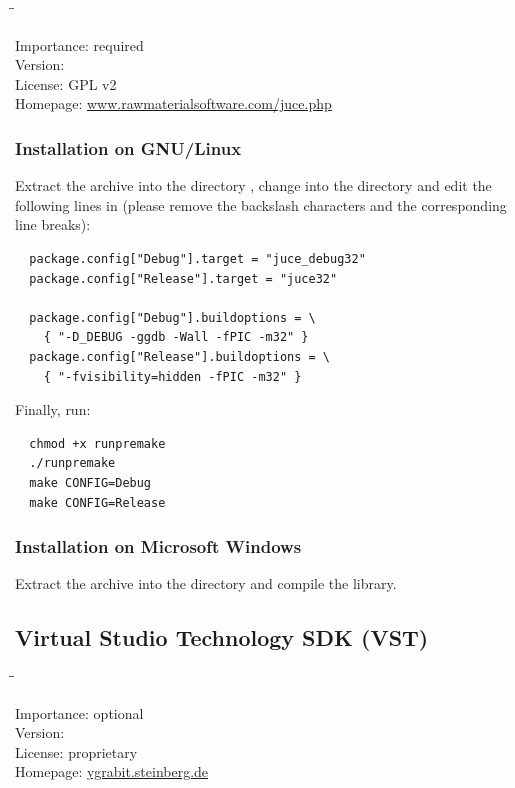 \begin{tabbing}
  \hspace*{6em}\=\=\kill

  Importance:  \> required \\
  Version:      \\
  License:     \> GPL v2 \\
  Homepage:    \> \href{http://www.rawmaterialsoftware.com/juce.php}{www.rawmaterialsoftware.com/juce.php}
\end{tabbing}

\subsubsection{Installation on GNU/Linux}

Extract the archive into the directory , change
into the directory  and edit the
following lines in  (please remove the
backslash characters and the corresponding line breaks):

\begin{verbatim}
  package.config["Debug"].target = "juce_debug32"
  package.config["Release"].target = "juce32"

  package.config["Debug"].buildoptions = \
    { "-D_DEBUG -ggdb -Wall -fPIC -m32" }
  package.config["Release"].buildoptions = \
    { "-fvisibility=hidden -fPIC -m32" }
\end{verbatim}

Finally, run:

\begin{verbatim}
  chmod +x runpremake
  ./runpremake
  make CONFIG=Debug
  make CONFIG=Release
\end{verbatim}

\subsubsection{Installation on Microsoft Windows}

Extract the archive into the directory  and
compile the library.

\subsection{Virtual Studio Technology SDK (VST)}

\begin{tabbing}
  \hspace*{6em}\=\=\kill

  Importance:  \> optional \\
  Version:      \\
  License:     \> proprietary \\
  Homepage:    \> \href{http://ygrabit.steinberg.de/}{ygrabit.steinberg.de}
\end{tabbing}

